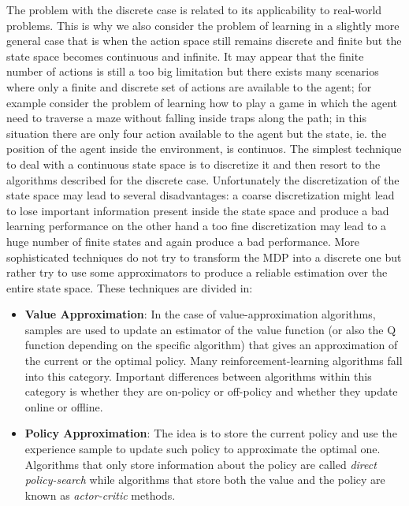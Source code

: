 	\noindent The problem with the discrete case is related to its applicability to real-world problems. This is why we also consider the problem of learning
	in a slightly more general case that is when the action space still remains discrete and finite but the state space becomes continuous and infinite.\newline
	It may appear that the finite number of actions is still a too big limitation but there exists many scenarios where only a finite and discrete
	set of actions are available to the agent; for example consider the problem of learning how to play a game in which the agent need to traverse a maze
	without falling inside traps along the path; in this situation there are only four action available to the agent but the state, ie. the position of
	the agent inside the environment, is continuos.\newline
	The simplest technique to deal with a continuous state space is to discretize it and then resort to the algorithms described for the discrete case.
	Unfortunately the discretization of the state space may lead to several disadvantages: a coarse discretization might lead to lose
	important information present inside the state space and produce a bad learning performance on the other hand a too fine discretization
	may lead to a huge number of finite states and again produce a bad performance.\newline
	More sophisticated techniques do not try to transform the MDP into a discrete one but rather try to use some approximators to
	produce a reliable estimation over the entire state space.\newline
	These techniques are divided in:
	\begin{itemize}
		\item \textbf{Value Approximation}: In the case of value-approximation algorithms, samples are used to update an estimator of the value function (or also the Q function depending on the specific algorithm)
			that gives an approximation of the current or the optimal policy. Many reinforcement-learning algorithms fall into this category. Important differences between algorithms within this category
			is whether they are on-policy or off-policy and whether they update online or offline.

		\item \textbf{Policy Approximation}: The idea is to store the current policy and use the experience sample to update
			such policy to approximate the optimal one. Algorithms that only store information about the policy are called
			\textit{direct policy-search} while algorithms that store both the value and the policy are known as \textit{actor-critic} methods.
	\end{itemize}

